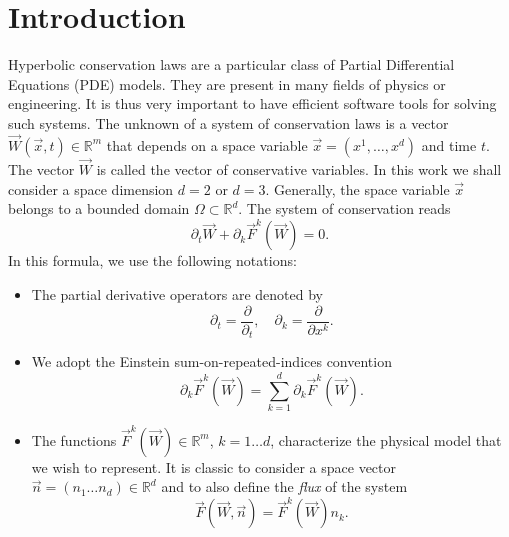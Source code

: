 \documentclass{svmult}
\begin{document}



\section{Introduction}
Hyperbolic conservation laws are a particular class of Partial
Differential Equations (PDE) models. They are present in many fields
of physics or engineering. It is thus very important to have efficient
software tools for solving such systems.  The unknown of a system of
conservation laws is a vector $\vec{W}(\vec{x},t)\in \mathbb{R}^m$
that depends on a space variable $\vec{x}=(x^1,\ldots, x^d)$ and time
$t$. The vector $\vec{W}$ is called the vector of conservative
variables. In this work we shall consider a space dimension $d=2$ or
$d=3$. Generally, the space variable $\vec{x}$ belongs to a bounded
domain $\Omega\subset \mathbb{R}^d$. The system of conservation reads
\begin{equation}
  \partial_t \vec{W} + \partial_k \vec{F}^k(\vec{W})=0. \label{eq:conslaw}
\end{equation}
In this formula, we use the following notations:
\begin{itemize}
\item The partial derivative operators are denoted
  by \begin{equation}\partial_t = \frac{\partial}{\partial_t},\quad
    \partial_k = \frac{\partial}{\partial {x^k}}.\end{equation}
\item We adopt the Einstein sum-on-repeated-indices
  convention \begin{equation}\partial_k \vec{F}^k(\vec{W})
    =\sum_{k=1}^{d}\partial_k \vec{F}^k(\vec{W}).\end{equation}
\item The functions $\vec{F}^k(\vec{W})\in \mathbb{R}^m$, $k=1\ldots
  d$, characterize the physical model that we wish to represent. It is
  classic to consider a space vector $\vec{n}=(n_1\ldots
  n_d)\in\mathbb{R}^d$ and to also define the \textit{flux} of the
  system
  \begin{equation}
    \vec{F}(\vec{W},\vec{n})=\vec{F}^k(\vec{W})n_k.
  \end{equation}
\end{itemize}
\end{document}
